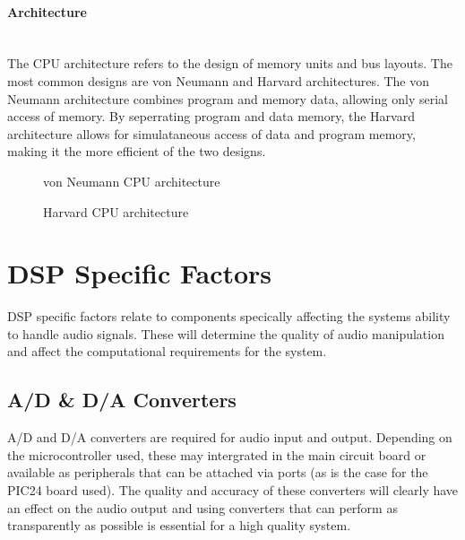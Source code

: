 \documentclass[titlepage]{scrartcl}
\begin{document}
    \paragraph{Architecture}~\\
    The CPU architecture refers to the design of memory units and bus layouts.
    The most common designs are von Neumann and Harvard architectures. The von
    Neumann architecture combines program and memory data, allowing only serial
    access of memory. By seperrating program and data memory, the Harvard
    architecture allows for simulataneous access of data and program memory,
    making it the more efficient of the two designs.
    \begin{figure}[H]
        \caption{von Neumann CPU architecture}
    \end{figure}
    \begin{figure}[H]
        \caption{Harvard CPU architecture}
    \end{figure}
    \newpage 
    \section{DSP Specific Factors}
    DSP specific factors relate to components specically affecting the systems
    ability to handle audio signals. These will determine the quality of audio
    manipulation and affect the computational requirements for the system.

    \subsection{A/D \& D/A Converters}
    A/D and D/A converters are required for audio input and output. Depending
    on the microcontroller used, these may intergrated in the main circuit
    board or available as peripherals that can be attached via ports (as is the
    case for the PIC24 board used). The quality and accuracy of these
    converters will clearly have an effect on the audio output and using
    converters that can perform as transparently as possible is essential for a
    high quality system.
    
\end{document}
